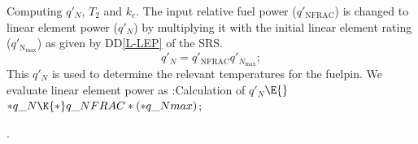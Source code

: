 \documentclass[letterpaper,12pt,baseclass=report]{cweb-hy}
\begin{document}
{
\fi

Computing ${q'_N}$, ${T_2}$ and ${k_c}$.\label{qt2k}
The input relative fuel power ($q'_{\mathrm{NFRAC}}$) is changed to
linear element power ($q'_{N}$) by multiplying it with the initial
linear element rating ($q'_{\mathrm{N_{max}}}$) as given by DD\ref{L-LEP} of
the SRS.
\begin{equation}
q'_N = q'_{\text{NFRAC}}q'_{N_{\text{max}}};
\end{equation}
This $q'_{N}$ is used to
determine the relevant temperatures for the fuelpin.
We evaluate linear element power as
\Y\B\4:Calculation of $q'_{N}$\X${}\E{}$\6
${*}\\{q\_N}\K{*}\\{q\_NFRAC}*({*}\\{q\_Nmax}){}$;\par
{}.\fi

}
\end{document}
